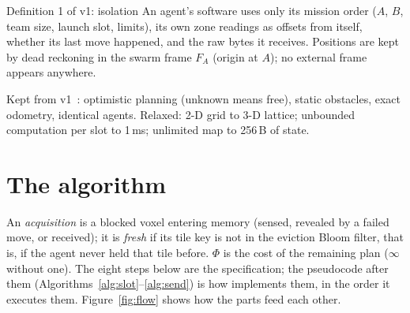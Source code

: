 \documentclass[11pt,a4paper]{article}
\newcommand{\code}[1]{\texttt{\detokenize{#1}}}
\begin{document}
\begin{defn}{Definition 1 of v1: isolation}
An agent's software uses only its mission order ($A$, $B$, team size, launch slot, limits), its own zone readings as
offsets from itself, whether its last move happened, and the raw bytes it receives. Positions are kept by dead
reckoning in the swarm frame $F_A$ (origin at $A$); no external frame appears anywhere.
\end{defn}

Kept from v1~\cite{v1}: optimistic planning (unknown means free), static obstacles, exact odometry, identical agents. Relaxed:
2-D grid to 3-D lattice; unbounded computation per slot to 1\,ms; unlimited map to 256\,B of state.

\section{The algorithm}\label{sec:protocol}

An \emph{acquisition} is a blocked voxel entering memory (sensed, revealed by a failed move, or received); it is
\emph{fresh} if its tile key is not in the eviction Bloom filter, that is, if the agent never held that tile before.
$\Phi$ is the cost of the remaining plan ($\infty$ without one). The eight steps below are the specification; the
pseudocode after them (Algorithms~\ref{alg:slot}--\ref{alg:send}) is how \code{src/sim3d/agent.py} implements them,
in the order it executes them. Figure~\ref{fig:flow} shows how the parts feed each other.
\end{document}
